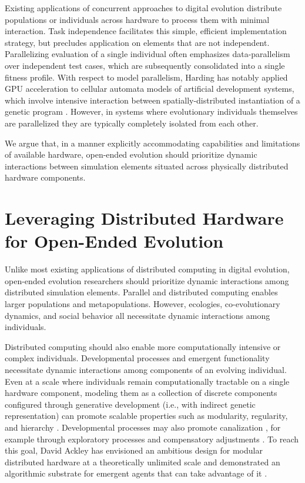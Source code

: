 Existing applications of concurrent approaches to digital evolution distribute populations or individuals across hardware to process them with minimal interaction.
Task independence facilitates this simple, efficient implementation strategy, but precludes application on elements that are not independent.
Parallelizing evaluation of a single individual often emphasizes data-parallelism over independent test cases, which are subsequently consolidated into a single fitness profile.
With respect to model parallelism, Harding has notably applied GPU acceleration to cellular automata models of artificial development systems, which involve intensive interaction between spatially-distributed instantiation of a genetic program \citep{harding2007fast_ieee}.
However, in systems where evolutionary individuals themselves are parallelized they are typically completely isolated from each other.

We argue that, in a manner explicitly accommodating capabilities and limitations of available hardware, open-ended evolution should prioritize dynamic interactions between simulation elements situated across physically distributed hardware components.

\section{Leveraging Distributed Hardware for Open-Ended Evolution}

Unlike most existing applications of distributed computing in digital evolution, open-ended evolution researchers should prioritize dynamic interactions among distributed simulation elements.
Parallel and distributed computing enables larger populations and metapopulations.
However, ecologies, co-evolutionary dynamics, and social behavior all necessitate dynamic interactions among individuals.

Distributed computing should also enable more computationally intensive or complex individuals.
Developmental processes and emergent functionality necessitate dynamic interactions among components of an evolving individual.
Even at a scale where individuals remain computationally tractable on a single hardware component, modeling them as a collection of discrete components configured through generative development (i.e., with indirect genetic representation) can promote scalable properties \citep{lipson2007principles} such as modularity, regularity, and hierarchy \citep{hornby2005measuring, clune2011performance}.
Developmental processes may also promote canalization \citep{stanley2003taxonomy}, for example through exploratory processes and compensatory adjustments \citep{gerhart2007theory}.
To reach this goal, David Ackley has envisioned an ambitious design for modular distributed hardware at a theoretically unlimited scale \citep{ackley2011pursue} and demonstrated an algorithmic substrate for emergent agents that can take advantage of it \citep{ackley2018digital}.

